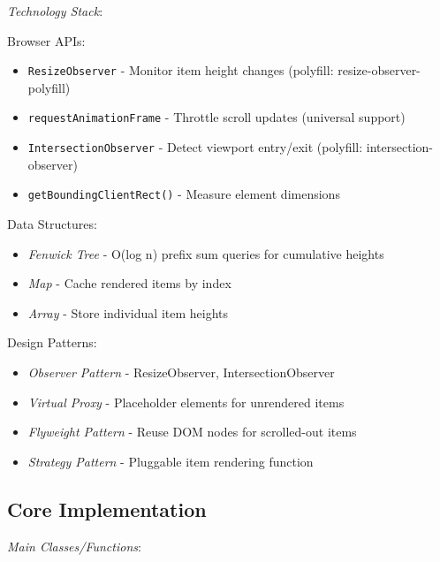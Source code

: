 \documentclass[11pt]{article}
\begin{document}
\emph{Technology Stack}:

Browser APIs:

\begin{itemize}
\item \texttt{ResizeObserver} - Monitor item height changes (polyfill: resize-observer-polyfill)
\item \texttt{requestAnimationFrame} - Throttle scroll updates (universal support)
\item \texttt{IntersectionObserver} - Detect viewport entry/exit (polyfill: intersection-observer)
\item \texttt{getBoundingClientRect()} - Measure element dimensions
\end{itemize}

Data Structures:

\begin{itemize}
\item \emph{Fenwick Tree} - O(log n) prefix sum queries for cumulative heights
\item \emph{Map} - Cache rendered items by index
\item \emph{Array} - Store individual item heights
\end{itemize}

Design Patterns:

\begin{itemize}
\item \emph{Observer Pattern} - ResizeObserver, IntersectionObserver
\item \emph{Virtual Proxy} - Placeholder elements for unrendered items
\item \emph{Flyweight Pattern} - Reuse DOM nodes for scrolled-out items
\item \emph{Strategy Pattern} - Pluggable item rendering function
\end{itemize}
\subsection{Core Implementation}
\label{sec:org027c581}

\emph{Main Classes/Functions}:
\end{document}
